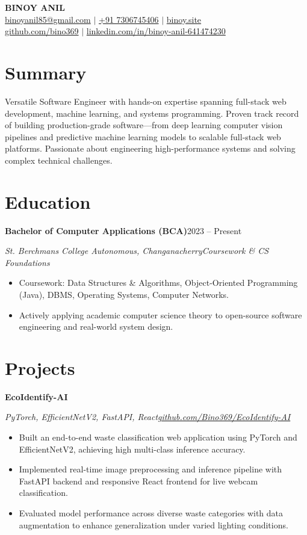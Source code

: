 \documentclass[10pt,a4paper]{article}
\newcommand{\resumeSubheading}[4]{%
  \textbf{#1}\hfill #2\par
  \textit{#3}\hfill \textit{#4}\par\vspace{1.5pt}%
}
\newenvironment{resumeEntry}[4]{
  \resumeSubheading{#1}{#2}{#3}{#4}
  \begin{itemize}
}{
  \end{itemize}\vspace{3.5pt}
}
\newcommand{\ghuser}{Bino369}
\newcommand{\ghrepo}[1]{\href{https://github.com/\ghuser/#1}{github.com/\ghuser/#1}}
\begin{document}
\begin{center}
    {\huge\textbf{\color{darkgray}BINOY ANIL}} \\[3pt]
    \small
    \href{mailto:binoyanil85@gmail.com}{binoyanil85@gmail.com} \quad $\vert$ \quad
    \href{tel:+917306745406}{+91 7306745406} \quad $\vert$ \quad
    \href{https://binoy.site}{binoy.site} \\[2pt]
    \href{https://github.com/bino369}{github.com/bino369} \quad $\vert$ \quad
    \href{https://linkedin.com/in/binoy-anil-641474230}{linkedin.com/in/binoy-anil-641474230}
\end{center}

\section*{Summary}
Versatile Software Engineer with hands-on expertise spanning full-stack web development, machine learning, and systems programming. Proven track record of building production-grade software---from deep learning computer vision pipelines and predictive machine learning models to scalable full-stack web platforms. Passionate about engineering high-performance systems and solving complex technical challenges.

\section*{Education}
\begin{resumeEntry}
  {Bachelor of Computer Applications (BCA)}{2023 -- Present}
  {St. Berchmans College Autonomous, Changanacherry}{Coursework \& CS Foundations}
  \item Coursework: Data Structures \& Algorithms, Object-Oriented Programming (Java), DBMS, Operating Systems, Computer Networks.
  \item Actively applying academic computer science theory to open-source software engineering and real-world system design.
\end{resumeEntry}

\section*{Projects}

\begin{resumeEntry}
  {EcoIdentify-AI}{}
  {PyTorch, EfficientNetV2, FastAPI, React}{\ghrepo{EcoIdentify-AI}}
  \item Built an end-to-end waste classification web application using PyTorch and EfficientNetV2, achieving high multi-class inference accuracy.
  \item Implemented real-time image preprocessing and inference pipeline with FastAPI backend and responsive React frontend for live webcam classification.
  \item Evaluated model performance across diverse waste categories with data augmentation to enhance generalization under varied lighting conditions.
\end{resumeEntry}
\end{document}
